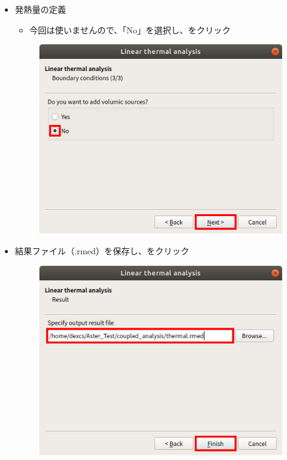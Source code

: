 \begin{itemize}
\begin{figure}[H]
	      \end{figure}
	      \clearpage
	\item 発熱量の定義
	      \begin{itemize}
		      \item 今回は使いませんので、「No」を選択し、をクリック
	      \end{itemize}
	      \begin{figure}[H]
		      \centering
		      \includegraphics{fig/Assisant_thermal_007.png}
	      \end{figure}
	      \clearpage
	\item 結果ファイル（.rmed）を保存し、をクリック
	      \begin{figure}[H]
		      \centering
		      \includegraphics{fig/Assisant_thermal_008.png}
	      \end{figure}
\end{itemize}
\clearpage
